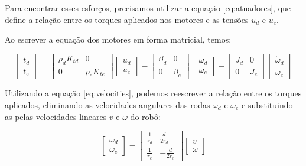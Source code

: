 Para encontrar esses esforços, precisamos utilizar a equação \ref{eq:atuadores}, 
que define a relação entre os torques aplicados nos motores e as tensões $u_d$ e $u_e$.

Ao escrever a equação dos motores em forma matricial, temos:

\begin{equation}
\begin{bmatrix}
t_d \\
t_e
\end{bmatrix}
=
\begin{bmatrix}
\rho_d K_{t d} & 0 \\
0 & \rho_e K_{t e}
\end{bmatrix}
\begin{bmatrix}
u_d \\
u_e
\end{bmatrix}
-
\begin{bmatrix}
\beta_d & 0 \\
0 & \beta_e
\end{bmatrix}
\begin{bmatrix}
\omega_d \\
\omega_e
\end{bmatrix}
-
\begin{bmatrix}
J_d & 0 \\
0 & J_e
\end{bmatrix}
\begin{bmatrix}
\dot{\omega}_d \\
\dot{\omega}_e
\end{bmatrix}
\end{equation}

Utilizando a equação \ref{eq:velocities}, podemos 
reescrever a relação entre os torques aplicados, 
eliminando as velocidades angulares das rodas $\omega_d$ e $\omega_e$
e substituindo-as pelas velocidades lineares $v$ e $\omega$ do robô:

\begin{equation}
\begin{bmatrix}
\omega_d \\
\omega_e
\end{bmatrix}
= 
\begin{bmatrix}
\frac{1}{r_d} & \frac{d}{2r_d} \\
\frac{1}{r_e} & -\frac{d}{2r_e}
\end{bmatrix}
\begin{bmatrix}
v \\
\omega
\end{bmatrix}
\end{equation}

